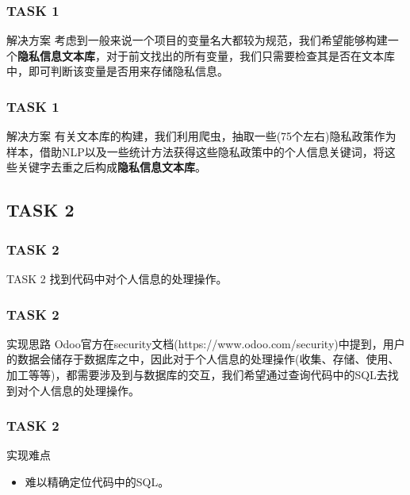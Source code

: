 \documentclass[10pt]{ctexbeamer}
\begin{document}
    \begin{frame}
        \frametitle{TASK 1}
        \begin{block}{解决方案}
            考虑到一般来说一个项目的变量名大都较为规范，我们希望能够构建一个\textbf{隐私信息文本库}，对于前文找出的所有变量，我们只需要检查其是否在文本库中，即可判断该变量是否用来存储隐私信息。
        \end{block}
    \end{frame}

    \begin{frame}
        \frametitle{TASK 1}
        \begin{block}{解决方案}
            有关文本库的构建，我们利用爬虫，抽取一些(75个左右)隐私政策作为样本，借助NLP以及一些统计方法获得这些隐私政策中的个人信息关键词，将这些关键字去重之后构成\textbf{隐私信息文本库}。

        \end{block}
    \end{frame}

    \subsection{TASK 2}
    \begin{frame}
        \frametitle{TASK 2}
        \begin{block}{TASK 2}
            找到代码中对个人信息的处理操作。
        \end{block}
    \end{frame}

    \begin{frame}
        \frametitle{TASK 2}
        \begin{block}{实现思路}
            Odoo官方在security文档(https://www.odoo.com/security)中提到，用户的数据会储存于数据库之中，因此对于个人信息的处理操作(收集、存储、使用、加工等等)，都需要涉及到与数据库的交互，我们希望通过查询代码中的SQL去找到对个人信息的处理操作。
        \end{block}
    \end{frame}

    \begin{frame}
        \frametitle{TASK 2}
        \begin{block}{实现难点}
            \begin{itemize}
                \item 难以精确定位代码中的SQL。
            \end{itemize}
        \end{block}
    \end{frame}
\end{document}
